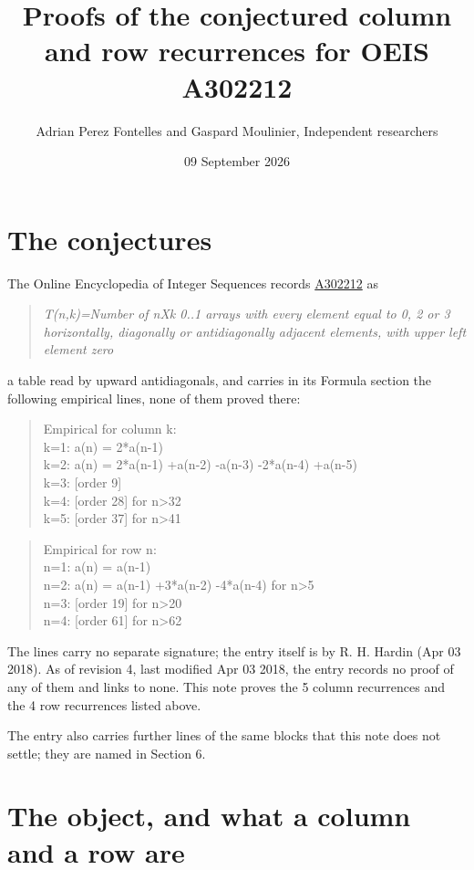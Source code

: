 \documentclass[11pt]{article}
\title{Proofs of the conjectured column and row recurrences for OEIS A302212}
\author{Adrian Perez Fontelles and Gaspard Moulinier, Independent researchers}
\date{09 September 2026}
\theoremstyle{definition}
\begin{document}
\maketitle
\section{The conjectures}

The Online Encyclopedia of Integer Sequences records \href{https://oeis.org/A302212}{A302212} as

\begin{quote}\itshape T(n,k)=Number of nXk 0..1 arrays with every element equal to 0, 2 or 3 horizontally, diagonally or antidiagonally adjacent elements, with upper left element zero\end{quote}

a table read by upward antidiagonals, and carries in its Formula section the following empirical lines, none of them proved there:

\begin{quote}\ttfamily Empirical for column k:\\
k=1: a(n) = 2*a(n-1)\\k=2: a(n) = 2*a(n-1) +a(n-2) -a(n-3) -2*a(n-4) +a(n-5)\\k=3: [order 9]\\k=4: [order 28] for n>32\\k=5: [order 37] for n>41\end{quote}

\begin{quote}\ttfamily Empirical for row n:\\
n=1: a(n) = a(n-1)\\n=2: a(n) = a(n-1) +3*a(n-2) -4*a(n-4) for n>5\\n=3: [order 19] for n>20\\n=4: [order 61] for n>62\end{quote}

The lines carry no separate signature; the entry itself is by R. H. Hardin (Apr 03 2018). As of revision 4, last modified Apr 03 2018, the entry records no proof of any of them and links to none. This note proves the 5 column recurrences and the 4 row recurrences listed above.

The entry also carries further lines of the same blocks that this note does not settle; they are named in Section 6.

\section{The object, and what a column and a row are}
\end{document}

